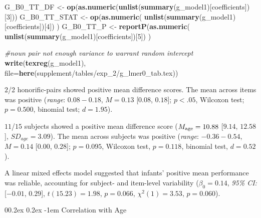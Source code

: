 \documentclass[
  doc,floatsintext]{apa6}
\makeatletter
\newenvironment{Shaded}{\begin{snugshade}}{\end{snugshade}}
\newcommand{\AttributeTok}[1]{\textcolor[rgb]{0.13,0.29,0.53}{#1}}
\newcommand{\CommentTok}[1]{\textcolor[rgb]{0.56,0.35,0.01}{\textit{#1}}}
\newcommand{\DecValTok}[1]{\textcolor[rgb]{0.00,0.00,0.81}{#1}}
\newcommand{\FunctionTok}[1]{\textcolor[rgb]{0.13,0.29,0.53}{\textbf{#1}}}
\newcommand{\NormalTok}[1]{#1}
\newcommand{\OtherTok}[1]{\textcolor[rgb]{0.56,0.35,0.01}{#1}}
\newcommand{\StringTok}[1]{\textcolor[rgb]{0.31,0.60,0.02}{#1}}
\let\oldparagraph\paragraph
\renewcommand{\paragraph}{
    \@ifstar
      \xxxParagraphStar
      \xxxParagraphNoStar
  }
\newcommand{\xxxParagraphStar}[1]{\oldparagraph*{#1}\mbox{}}
\newcommand{\xxxParagraphNoStar}[1]{\oldparagraph{#1}\mbox{}}
\renewcommand{\paragraph}{\@startsection{paragraph}{4}{\parindent}%
  {0\baselineskip \@plus 0.2ex \@minus 0.2ex}%
  {-1em}%
  {\normalfont\normalsize\bfseries\itshape\typesectitle}}
\makeatother
\begin{document}
\begin{Shaded}
\begin{Highlighting}[]
\NormalTok{G\_B0\_TT\_DF }\OtherTok{\textless{}{-}} \FunctionTok{op}\NormalTok{(}\FunctionTok{as.numeric}\NormalTok{(}\FunctionTok{unlist}\NormalTok{(}\FunctionTok{summary}\NormalTok{(g\_model1)[}\StringTok{\textquotesingle{}coefficients\textquotesingle{}}\NormalTok{])[}\DecValTok{3}\NormalTok{]))}
\NormalTok{G\_B0\_TT\_STAT }\OtherTok{\textless{}{-}} \FunctionTok{op}\NormalTok{(}\FunctionTok{as.numeric}\NormalTok{(}
  \FunctionTok{unlist}\NormalTok{(}\FunctionTok{summary}\NormalTok{(g\_model1)[}\StringTok{\textquotesingle{}coefficients\textquotesingle{}}\NormalTok{])[}\DecValTok{4}\NormalTok{])}
\NormalTok{  )}
\NormalTok{G\_B0\_TT\_P }\OtherTok{\textless{}{-}} \FunctionTok{reportP}\NormalTok{(}\FunctionTok{as.numeric}\NormalTok{(}
  \FunctionTok{unlist}\NormalTok{(}\FunctionTok{summary}\NormalTok{(g\_model1)[}\StringTok{\textquotesingle{}coefficients\textquotesingle{}}\NormalTok{])[}\DecValTok{5}\NormalTok{])}
\NormalTok{  )}

\CommentTok{\#noun pair not enough variance to warrant random intercept}
\FunctionTok{write}\NormalTok{(}\FunctionTok{texreg}\NormalTok{(g\_model1), }
      \AttributeTok{file=}\FunctionTok{here}\NormalTok{(}\StringTok{\textquotesingle{}supplement/tables/exp\_2/g\_lmer0\_tab.tex\textquotesingle{}}\NormalTok{))}
\end{Highlighting}
\end{Shaded}

\(2\)/2 honorific-pairs showed positive mean difference scores.
The mean across items was positive (\textit{range}: \(0.08-0.18\),
\(M=0.13\) {[}\(0.08\), \(0.18\){]}; \(p<.05\), Wilcoxon test; \(p=0.500\), binomial test; \(d=1.95\)).

\(11\)/\(15\) subjects showed a positive mean difference score (\(M_\textnormal{age}=10.88\) {[}\(9.14\), \(12.58\){]}, \(SD_{age}=3.09\)).
The mean across subjects was positive (\textit{range}: \(-0.36-0.54\), \(M=0.14\) {[}\(0.00\), \(0.28\){]}; \(p=0.095\), Wilcoxon test, \(p=0.118\), binomial test, \(d=0.52\)).

A linear mixed effects model suggested that infants' positive mean performance was reliable, accounting for subject- and item-level variability (\(\beta_0=0.14\),
\textit{95\% CI:} {[}\(-0.01\), \(0.29\){]},
\(t(15.23)=1.98\),
\(p=0.066\), \(\chi^2(1)=3.53\), \(p=0.060\)).

\paragraph{Correlation with Age}\label{correlation-with-age}
\end{document}
